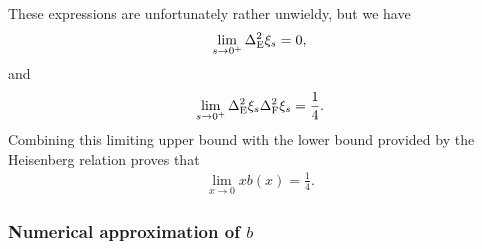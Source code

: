 These expressions are unfortunately rather unwieldy, but we have
\begin{align}
  \lim_{s\to 0^+} \var[\ope]{\xi_s} = 0,
\end{align}
and 
\begin{align}
  \lim_{s\to 0^+} \var[\ope]{\xi_s}\var[\opf]{\xi_s} = \frac{1}{4}.
\end{align}
Combining this limiting upper bound with the lower bound provided by the Heisenberg relation proves that
\begin{align}
  \lim_{x\to 0} x b(x) = \frac{1}{4}.
\end{align}

\subsubsection{Numerical approximation of $b$}

